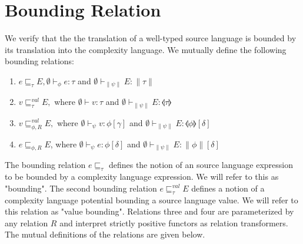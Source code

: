 \section{Bounding Relation}
%
We verify that the the translation of a well-typed source language is bounded
by its translation into the complexity language. We mutually define the
following bounding relations:
%
\begin{enumerate}
  \item $e \sqsubseteq_\tau E, \emptyset \vdash_\phi e : \tau$ and $\emptyset \vdash_{\|\psi\|} E : \|\tau\|$
  \item $v \sqsubseteq_\tau^{val} E, $ where $\emptyset \vdash v : \tau$ and $\emptyset \vdash_{\|\psi\|} E : \llangle \tau \rrangle$
  \item $v \sqsubseteq_{\phi,R}^{val} E, $ where $ \emptyset \vdash_\psi v : \phi[\gamma]$ and $\emptyset \vdash_{\|\psi\|} E : \llangle \phi \rrangle[\delta]$
  \item $e \sqsubseteq_{\phi,R} E$, where $\emptyset \vdash_\psi e : \phi[\delta]$ and $\emptyset \vdash_{\|\psi\|} E : \|\phi\|[\delta]$
\end{enumerate}
%
The bounding relation $e \sqsubseteq_\tau$ defines the notion of an source
language expression to be bounded by a complexity language expression. We will
refer to this as "bounding". The second bounding relation $e
\sqsubseteq_\tau^{val} E$ defines a notion of a complexity language potential
bounding a source language value. We will refer to this relation as "value
bounding". Relations three and four are parameterized by any relation $R$ and
interpret strictly positive functors as relation transformers. The mutual
definitions of the relations are given below.
%
